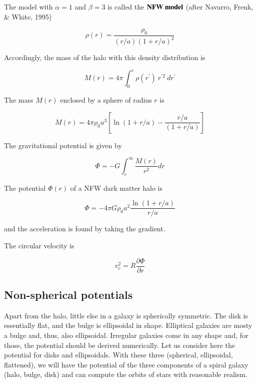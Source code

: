 The model with $\alpha = 1$ and $\beta=3$ is called the ${\bf NFW \ model}$ (after Navarro, Frenk, \& White, 1995)

\begin{equation}
\rho(r) = \frac{\rho_0}{(r/a) (1+r/a)^2}
\end{equation}


Accordingly, the mass of the halo with this density distribution is 

\begin{equation}
M(r) =  4\pi \int_0^{r} \rho(r^\prime) \ r^{\prime 2} \ dr^\prime 
\end{equation}


The mass $M(r)$ enclosed by a sphere of radius $r$ is

\begin{equation}
\boxed{
M(r) = 4\pi \rho_0 a^3  \left[ \ln\left(1+r/a\right)  -\frac{r/a}{(1+r/a)} \right]
}
\end{equation}


The gravitational potential is given by 

\begin{equation}
\varPhi = -G\int_r^{\infty} \frac{M(r)}{r^2} dr
\end{equation}


The potential $\varPhi(r)$ of a NFW dark matter halo is

\begin{equation}
\boxed{
\varPhi = -4\pi G \rho_0 a^2\frac{\ln(1+r/a)}{r/a}
}
\end{equation}

and the acceleration is found by taking the gradient. 


The circular velocity is 


\begin{equation}
v_c^2 = R\frac{\partial \varPhi}{\partial r}
\end{equation}


\subsection{Non-spherical potentials}

Apart from the halo, little else in a galaxy is spherically symmetric. The disk is essentially flat, and the bulge is ellipsoidal in shape. Elliptical galaxies are mosty a bulge and, thus, also ellipsoidal. Irregular galaxies come in any shape and, for those, the potential should be derived numerically. Let us consider here the potential for disks and ellipsoidals. With these three (spherical, ellipsoidal, flattened), we will have the potential of the three components of a spiral galaxy (halo, bulge, disk) and can compute the orbits of stars with reasonable realism.


